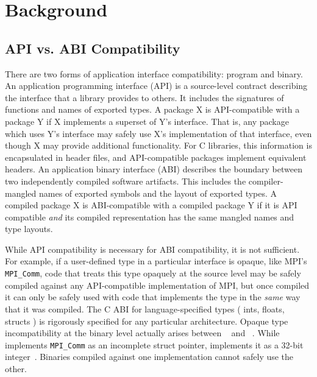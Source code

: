 \section{Background}
\subsection{API vs. ABI Compatibility}
There are two forms of application interface compatibility: program and binary.
An application programming interface (API) is a source-level contract describing
the interface that a library provides to others. It includes the signatures of
functions and names of exported types. A package X is API-compatible with a
package Y if X implements a superset of Y's interface. That is, any package
which uses Y's interface may safely use X's implementation of that interface,
even though X may provide additional functionality. For C libraries, this
information is encapsulated in header files, and API-compatible packages
implement equivalent headers. An
application binary interface (ABI) describes the boundary between two
independently compiled software artifacts. This includes the compiler-mangled
names of exported symbols and the layout of exported types. A compiled package X
is ABI-compatible with a compiled package Y if it is API compatible {\it and}
its compiled representation has the same mangled names and type layouts.

While API compatibility is necessary for ABI compatibility, it is not
sufficient. For example, if a user-defined type in a particular interface is
opaque, like MPI's \texttt{MPI\_Comm}, code that treats this type opaquely
at the source level may be safely compiled against any API-compatible
implementation of MPI, but once compiled it can only be safely used with code that
implements the type in the \emph{same} way that it was compiled. The C ABI for
language-specified types (\eg{} ints, floats, structs \etc{}) is rigorously
specified for any particular architecture. Opaque type incompatibility at the
binary level actually arises between ~\cite{gabriel2004open}
and ~\cite{gropp1996mpich}.
While  implements \texttt{MPI\_Comm} as an incomplete
struct pointer,  implements it as a 32-bit integer~\cite{hammond2023mpi}.
Binaries compiled against one implementation cannot safely use the other.

